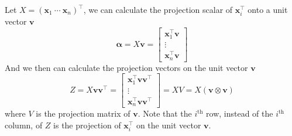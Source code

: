\begin{Ex}
    Let $X = (\mathbf{x}_1\  \cdots\ \mathbf{x}_n )^{\top}$, we can calculate the projection scalar of $\mathbf{x}_i^{\top}$ onto a unit vector $\mathbf{v}$
    \begin{equation}
    \mathbf{\alpha} = X\mathbf{v} = \begin{bmatrix}
        \mathbf{x}_1 ^{\top} \mathbf{v}\\
        \vdots\\
        \mathbf{x}_n ^{\top} \mathbf{v}
    \end{bmatrix}
\end{equation}
And we then can calculate the projection vectors on the unit vector $\mathbf{v}$
\begin{equation}
    Z = X\mathbf{v}\mathbf{v}^{\top} = 
       \begin{bmatrix}
        \mathbf{x}_1 ^{\top} \mathbf{v} \mathbf{v}^{\top}\\
        \vdots\\
        \mathbf{x}_n ^{\top} \mathbf{v} \mathbf{v}^{\top}
    \end{bmatrix}
    = XV = X(\mathbf{v} \otimes \mathbf{v})
\end{equation}
where $V$ is the projection matrix of $\mathbf{v}$. Note that the $i^\text{th}$ row, instead of the $i^{\text{th}}$ column, of $Z$ is the projection of $\mathbf{x}_i^{\top}$ on the unit vector $\mathbf{v}$.
\end{Ex}

